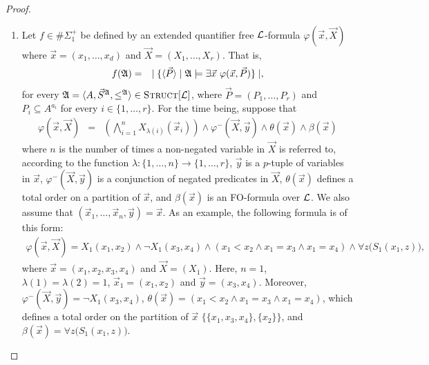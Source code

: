 \documentclass[12pt]{article}
\def\E1{\#\Sigma_1^{+}}
\def\Truc{\textsc{Struct}[\L]}
\def\A{{\frak A}}
\def\L{{\cal L}}
\def\P{\vec{P}}
\def\S{\vec{S}}
\def\X{\vec{X}}
\def\x{\vec{x}} %
\def\y{\vec{y}} %
\begin{document}
\begin{proof}
\begin{enumerate}
\item Let $f \in \E1$ be defined by an extended quantifier free $\L$-formula $\varphi(\x,\X)$ where $\x = (x_1,\dots,x_d)$ and $\X = (X_1,\dots,X_r)$. That is,
\begin{eqnarray*}
f(\A) &=& \mid \{ \langle\P\rangle \mid \A \models \exists \x \ \varphi(\x,\P) \} \mid \label{f1},
\end{eqnarray*}
for every $\A = \langle A, \S^{\A}, \leq^{\A} \rangle \in \Truc$, where $\P = (P_1,\ldots,P_r)$ and $P_i \subseteq A^{a_i}$ for every $i \in \{1,\ldots,r\}$. For the time being, suppose that
\begin{eqnarray}
\varphi(\x,\X) &=& \left( \bigwedge_{i=1}^n X_{\lambda(i)}(\x_i) \right) \wedge \varphi^{-}(\X,\y) \wedge \theta(\x) \wedge \beta(\x)
\end{eqnarray}
where $n$ is the number of times a non-negated variable in $\X$ is referred to, according to the function $\lambda:\{1,\ldots,n\}\to\{1,\ldots,r\}$, $\y$ is a $p$-tuple of variables in $\x$, $\varphi^{-}(\X,\y)$ is a conjunction of negated predicates in $\X$, $\theta(\x)$ defines a total order on a partition of $\x$, and $\beta(\x)$ is an FO-formula over $\L$. We also assume that $(\x_1,\dots,\x_n,\y) = \x$. As an example, the following formula is of this form:
\begin{align*}
\varphi(\x,\X) =  X_1(x_1,x_2) \wedge \neg X_1(x_3,x_4) \wedge (x_1 < x_2 \wedge x_1 = x_3 \wedge x_1 = x_4 ) \wedge \forall z\big( S_1(x_1,z) \big),
\end{align*}
where $\x = (x_1,x_2,x_3,x_4)$ and $\X = (X_1)$. Here, $n = 1$, $\lambda(1) = \lambda(2) = 1$, $\x_1 = (x_1,x_2)$ and $\y = (x_3,x_4)$. Moreover, $\varphi^{-}(\X,\y) = \neg X_1(x_3,x_4)$, $\theta(\x) = (x_1 < x_2 \wedge x_1 = x_3 \wedge x_1 = x_4)$, which defines a total order on the partition of $\x$ $\{\{x_1,x_3,x_4\},\{x_2\}\}$, and $\beta(\x) = \forall z\big( S_1(x_1,z) \big)$.


\end{enumerate}
\end{proof}
\end{document}
